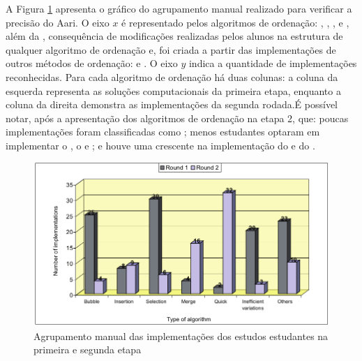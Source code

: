 		A Figura \ref{fig:clusterManual} apresenta o gráfico do agrupamento manual
		realizado para verificar a precisão do Aari. O eixo $x$ é representado pelos
		algoritmos de ordenação: , ,
		,  e , além
		da , consequência de modificações realizadas
		pelos alunos na estrutura de qualquer algoritmo de ordenação e, 
		foi criada a partir das implementações de outros métodos de ordenação: 
		 e . O eixo $y$ indica a quantidade de implementações
		reconhecidas. Para cada algoritmo de ordenação há duas colunas: a coluna da
		esquerda representa as soluções computacionais da primeira etapa, enquanto a
		coluna da direita demonstra as implementações da segunda rodada.É  possível notar,
		após a apresentação dos algoritmos de ordenação na etapa 2, que: poucas
		implementações foram classificadas como ; menos
		estudantes optaram em implementar o , o  e ; e houve uma crescente na implementação do  e do .
	    
	    \begin{figure}[h]
	        \centering
	        \includegraphics[scale=0.4]{imagem/clusterManual.png}
	        \captionsetup{justification=centering}
	        \caption{Agrupamento manual das implementações dos estudos estudantes na
	        	primeira e segunda etapa}
	        \label{fig:clusterManual}
	    \end{figure}
	    
